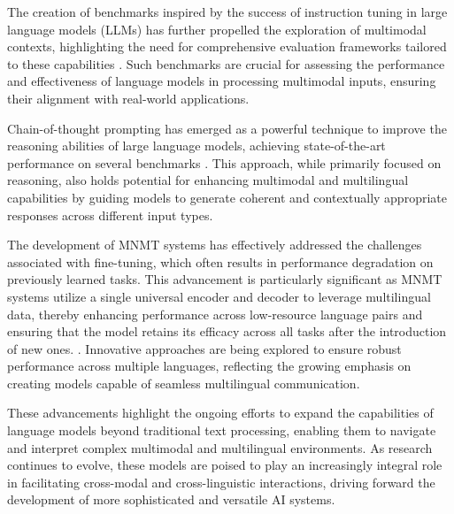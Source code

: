 The creation of benchmarks inspired by the success of instruction tuning in large language models (LLMs) has further propelled the exploration of multimodal contexts, highlighting the need for comprehensive evaluation frameworks tailored to these capabilities \cite{liu2024visual}. Such benchmarks are crucial for assessing the performance and effectiveness of language models in processing multimodal inputs, ensuring their alignment with real-world applications.



Chain-of-thought prompting has emerged as a powerful technique to improve the reasoning abilities of large language models, achieving state-of-the-art performance on several benchmarks \cite{wei2022chain}. This approach, while primarily focused on reasoning, also holds potential for enhancing multimodal and multilingual capabilities by guiding models to generate coherent and contextually appropriate responses across different input types.



The development of MNMT systems has effectively addressed the challenges associated with fine-tuning, which often results in performance degradation on previously learned tasks. This advancement is particularly significant as MNMT systems utilize a single universal encoder and decoder to leverage multilingual data, thereby enhancing performance across low-resource language pairs and ensuring that the model retains its efficacy across all tasks after the introduction of new ones. \cite{zhao2022lifelonglearningmultilingualneural}. Innovative approaches are being explored to ensure robust performance across multiple languages, reflecting the growing emphasis on creating models capable of seamless multilingual communication.



These advancements highlight the ongoing efforts to expand the capabilities of language models beyond traditional text processing, enabling them to navigate and interpret complex multimodal and multilingual environments. As research continues to evolve, these models are poised to play an increasingly integral role in facilitating cross-modal and cross-linguistic interactions, driving forward the development of more sophisticated and versatile AI systems.













